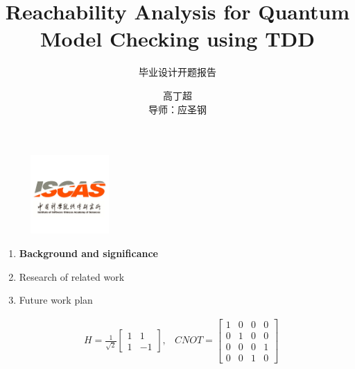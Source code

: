 \documentclass[aspectratio=1610,18pt]{ctexbeamer}
\title[TDD in quantum]{Reachability Analysis for Quantum Model Checking using TDD}
\subtitle{毕业设计开题报告}
\author{高丁超\\导师：应圣钢}
\begin{document}
\begin{frame}[plain]
  \titlepage
  \begin{figure}
    \centering
    \begin{minipage}[t]{0.48\textwidth}
    \centering
    \includegraphics[width=3cm]{iscas.png}
    \end{minipage}
  \end{figure}
\end{frame}
\begin{frame}
  \begin{enumerate}
    \Large
    \item \textbf{Background and significance}
    \item Research of related work
    \item Future work plan
  \end{enumerate}
\end{frame}
\begin{frame}
  \begin{figure}[h]
    \centering
    \end{figure}
\end{frame}
\begin{frame}
  \begin{align}
    &H=\frac{1}{\sqrt{2}}\left[\begin{array}{rr}
    1 & 1 \\
    1 & -1
    \end{array}\right]
    ,
    
    &CNOT=\left[\begin{array}{llll}
    1 & 0 & 0 & 0 \\
    0 & 1 & 0 & 0 \\
    0 & 0 & 0 & 1 \\
    0 & 0 & 1 & 0
    \end{array}\right]
    \end{align}
\end{frame}
\end{document}
